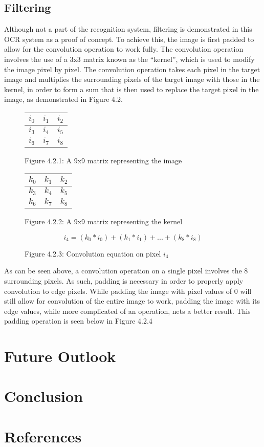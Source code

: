 \documentclass[twocolumn]{article}
\begin{document}
\subsection{Filtering}
Although not a part of the recognition system, filtering is demonstrated in this OCR system as a proof of concept. To achieve this, the image is first padded to allow for the convolution operation to work fully. The convolution operation involves the use of a 3x3 matrix known as the “kernel”, which is used to modify the image pixel by pixel. The convolution operation takes each pixel in the target image and multiplies the surrounding pixels of the target image with those in the kernel, in order to form a sum that is then used to replace the target pixel in the image, as demonstrated in Figure 4.2. \par

\begin{figure}[h]
\centering
\begin{tabular}{ |c|c|c| } 
    \hline
    \(i_0\) & \(i_1\) & \(i_2\) \\
    \hline
    \(i_3\) & \(i_4\) & \(i_5\) \\ 
    \hline
    \(i_6\) & \(i_7\) & \(i_8\) \\ 
    \hline
\end{tabular}
\caption*{Figure 4.2.1: A 9x9 matrix representing the image}
\end{figure}

\begin{figure}[h]
\centering
\begin{tabular}{ |c|c|c| } 
    \hline
    \(k_0\) & \(k_1\) & \(k_2\) \\
    \hline
    \(k_3\) & \(k_4\) & \(k_5\) \\ 
    \hline
    \(k_6\) & \(k_7\) & \(k_8\) \\ 
    \hline
\end{tabular}
\caption*{Figure 4.2.2: A 9x9 matrix representing the kernel}
\label{Figure 4.2}
\end{figure}

\begin{figure}[h]
\centering
\begin{equation*}
i_4 = (k_0 * i_0) + (k_1 * i_1) + ... + (k_8 * i_8) 
\end{equation*}
\caption*{Figure 4.2.3: Convolution equation on pixel \(i_4\)}
\end{figure}

As can be seen above, a convolution operation on a single pixel involves the 8 surrounding pixels. As such, padding is necessary in order to properly apply convolution to edge pixels. While padding the image with pixel values of 0 will still allow for convolution of the entire image to work, padding the image with its edge values, while more complicated of an operation, nets a better result. This padding operation is seen below in Figure 4.2.4 \par

\section{Future Outlook}

\section{Conclusion}

\section{References}
\end{document}
